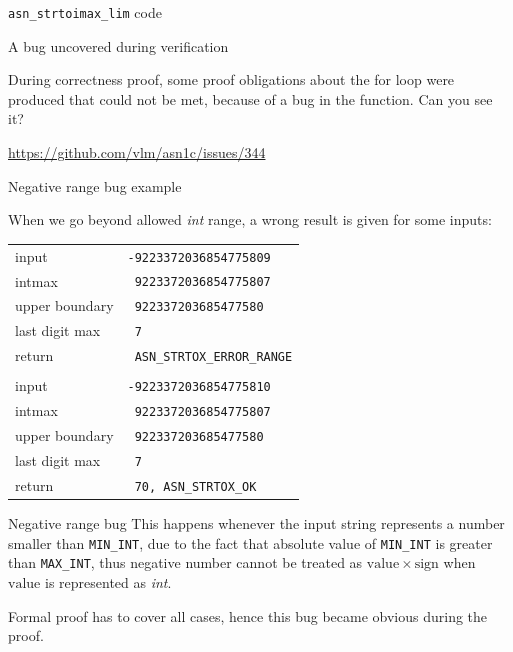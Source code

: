 \documentclass[10pt]{beamer}
\begin{document}
\begin{frame}{\texttt{asn\_strtoimax\_lim} code}
  
  {\fontsize{4}{1}\selectfont  }
  
\end{frame}


\begin{frame}{A bug uncovered during verification}

   During correctness proof, some proof obligations about the for loop were produced that could not be met, because of a bug in the function. Can you see it?

  \url{https://github.com/vlm/asn1c/issues/344}
  
\end{frame}

\begin{frame}{Negative range bug example}

When we go beyond allowed \textit{int} range, a wrong result is given for some inputs:  

\begin{table}[]
    \centering
    \begin{tabular}{l|l}
input & \texttt{-9223372036854775809} \\
intmax & \texttt{\ 9223372036854775807}\\
upper boundary& \texttt{\ 922337203685477580} \\
last digit max& \texttt{\ 7}\\
return & \color{green}\texttt{\ ASN\_STRTOX\_ERROR\_RANGE}\\
\hline \\
input & \texttt{-9223372036854775810} \\
intmax & \texttt{\ 9223372036854775807}\\
upper boundary& \texttt{\ 922337203685477580} \\
last digit max& \texttt{\ 7}\\
return & \color{red}\texttt{\ 70, ASN\_STRTOX\_OK}\\
    \end{tabular}
\end{table}

\end{frame}

\begin{frame}{Negative range bug}
    This happens whenever the input string represents a number smaller than \texttt{MIN\_INT}, due to the fact that absolute value of \texttt{MIN\_INT} is greater than \texttt{MAX\_INT}, thus negative number cannot be treated as $\mathrm{value}\times\mathrm{sign}$ when $\mathrm{value}$ is represented as \textit{int}. 
    
    Formal proof has to cover all cases, hence this bug became obvious during the proof.
    
\end{frame}{}
\end{document}
